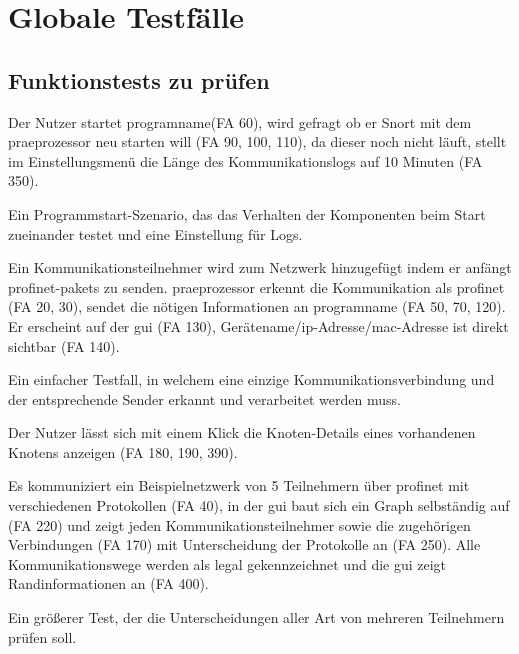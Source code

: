 \chapter{Globale Testfälle}

\section{Funktionstests zu prüfen}

\begin{description}[style=multiline, leftmargin=4cm, labelwidth=4cm]
  \item[\namedlabel{start}{Programm starten}] Der Nutzer startet \gls{programname}(FA 60), wird gefragt ob er Snort mit dem \gls{praeprozessor} neu starten will (FA 90, 100, 110), da dieser noch nicht läuft, stellt im Einstellungsmenü die Länge des Kommunikationslogs auf 10 Minuten (FA 350).
  \item[Beschreibung] Ein Programmstart-Szenario, das das Verhalten der Komponenten beim Start zueinander testet und eine Einstellung für Logs.
  \item[\namedlabel{addNetNode}{Kommunikationsteilnehmer hinzufügen}] Ein Kommunikationsteilnehmer wird zum Netzwerk hinzugefügt indem er anfängt \gls{profinet}-\glspl{paket} zu senden. \gls{praeprozessor} erkennt die Kommunikation als \gls{profinet} (FA 20, 30), sendet die nötigen Informationen an \gls{programname} (FA 50, 70, 120). Er erscheint auf der \gls{gui} (FA 130), Gerätename/\gls{ip}-Adresse/\gls{mac}-Adresse ist direkt sichtbar (FA 140). 
  \item[Beschreibung] Ein einfacher Testfall, in welchem eine einzige Kommunikationsverbindung und der entsprechende Sender erkannt und verarbeitet werden muss.
  \item[\namedlabel{infobox}{Details anzeigen}] Der Nutzer lässt sich mit einem Klick die Knoten-Details eines vorhandenen Knotens anzeigen (FA 180, 190, 390).
  \item[\namedlabel{normalWatch}{Normale Netzwerküberwachung}] Es kommuniziert ein Beispielnetzwerk von 5 Teilnehmern über \gls{profinet} mit verschiedenen Protokollen (FA 40), in der \gls{gui} baut sich ein Graph selbständig auf (FA 220) und zeigt jeden Kommunikationsteilnehmer sowie die zugehörigen Verbindungen (FA 170) mit Unterscheidung der Protokolle an (FA 250). Alle Kommunikationswege werden als legal gekennzeichnet und die \gls{gui} zeigt Randinformationen an (FA 400).
  \item[Beschreibung] Ein größerer Test, der die Unterscheidungen aller Art von mehreren Teilnehmern prüfen soll.

\end{description}
